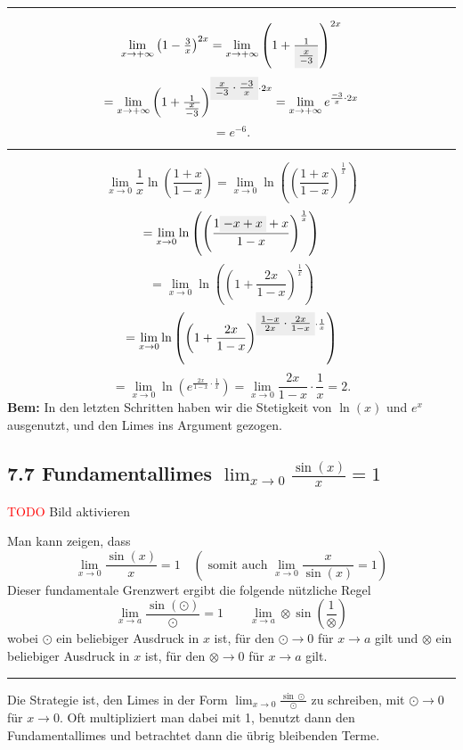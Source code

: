 \documentclass[a4paper,landscape,8pt]{extarticle}
\newcommand{\hl}[1]{\colorbox{black!7}{$#1$}}
\newcommand{\todo}{\textcolor{red}{TODO }}
\newcommand{\sep}{\vspace{5pt}\noindent\hrule\vspace{5pt}}
\newcommand{\Bem}{\textbf{Bem: }}
\begin{document}
\begin{multicols*}{4}
\sep

\Bsp
\[
\lim_{x\to+\infty} \left(1-\tfrac{3}{x}\right)^{2x}
=
\lim_{x\to+\infty} \left(1+\tfrac{1}{\hl{\tfrac{x}{-3}}}\right)^{2x}
\]
\[
=
\lim_{x\to+\infty}
\left(1+\tfrac{1}{\tfrac{x}{-3}}\right)^{\hl{\tfrac{x}{-3}\cdot
\tfrac{-3}{x}} \cdot 2x}
=
\lim_{x\to+\infty} e^{\frac{-3}{x}\cdot 2x}
\]
\[
=
e^{-6}.
\]

\sep

\begin{warmup}
\Bsp
\[
\lim_{x\to 0} \frac{1}{x} \ln\left(\frac{1+x}{1-x}\right) =
\lim_{x\to 0} \ln\left(\left(\frac{1+x}{1-x}\right)^{\frac{1}{x}}\right)
\]
\[
=\lim_{x\to 0}
\ln\left(\left(\frac{1\hl{-x+x}+x}{1-x}\right)^{\frac{1}{x}}\right)
\]
\[
=\lim_{x\to 0}
\ln\left(\left(1+\frac{2x}{1-x}\right)^{\frac{1}{x}}\right)
\]
\[
=\lim_{x\to 0}
\ln\left(\left(1+\frac{2x}{1-x}\right)^{\hl{\frac{1-x}{2x}
\cdot\frac{2x}{1-x}}\cdot\frac{1}{x}}\right)
\]
\[
=\lim_{x\to 0}
\ln\left(e^{\frac{2x}{1-x}\cdot\frac{1}{x}}\right)
=\lim_{x\to 0} \frac{2x}{1-x}\cdot\frac{1}{x} = 2.
\]
\Bem In den letzten Schritten haben wir die Stetigkeit von $\ln(x)$ und $e^x$
ausgenutzt, und den Limes ins Argument gezogen.
\end{warmup}

\subsection{7.7 Fundamentallimes $\lim_{x\to 0}\frac{\sin(x)}{x}=1$}

\begin{warmup}
\todo{Bild aktivieren}
\end{warmup}

Man kann zeigen, dass
\[
\lim_{x\to 0} \frac{\sin(x)}{x} = 1 \quad \left(\text{ somit auch }
\lim_{x\to 0} \frac{x}{\sin(x)} = 1\right)
\]
Dieser fundamentale Grenzwert ergibt die folgende nützliche Regel
\[
\lim_{x\to a} \frac{\sin(\odot)}{\odot} = 1
\qquad
\lim_{x\to a} \otimes \sin\left(\frac{1}{\otimes}\right)
\]
wobei $\odot$ ein beliebiger Ausdruck in $x$ ist, für den $\odot\to 0$ für
$x\to a$ gilt und $\otimes$ ein beliebiger Ausdruck in $x$ ist, für den
$\otimes\to 0$ für $x\to a$ gilt.

\sep

\Vorgehen Die Strategie ist, den Limes in der Form $\lim_{x\to 0}
\frac{\sin\odot}{\odot}$ zu schreiben, mit $\odot\to 0$ für $x\to 0$. Oft
multipliziert man dabei mit 1, benutzt dann den Fundamentallimes und betrachtet
dann die übrig bleibenden Terme.


\end{multicols*}
\end{document}
